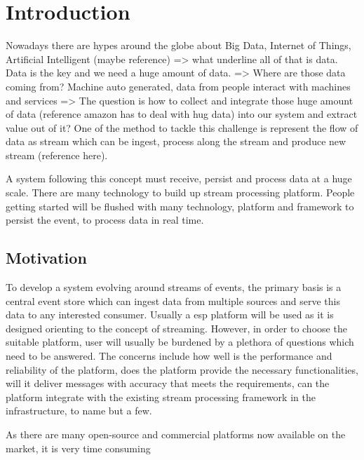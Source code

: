 \chapter{Introduction} \label{chap:intro}
Nowadays there are hypes around the globe about Big Data, Internet of Things, Artificial Intelligent (maybe reference) => what underline all of that is data. Data is the key and we need a huge amount of data. => Where are those data coming from? Machine auto generated, data from people interact with machines and services => The question is how to collect and integrate those huge amount of data (reference amazon has to deal with hug data) into our system and extract value out of it? One of the method to tackle this challenge is represent the flow of data as stream which can be ingest, process along the stream and produce new stream (reference here). 

A system following this concept must receive, persist and process data at a huge scale.  There are many technology to build up stream processing platform. People getting started will be flushed with many technology, platform and framework to persist the event, to process data in real time. 
\section{Motivation}
To develop a system evolving around streams of events, the primary basis is a central event store which can ingest data from multiple sources and serve this data to any interested consumer. Usually a \acrlong{esp} platform will be used as it is designed orienting to the concept of streaming. However, in order to choose the suitable platform, user will usually be burdened by a plethora of questions which need to be answered. The concerns include how well is the performance and reliability of the platform, does the platform provide the necessary functionalities, will it deliver messages with accuracy that meets the requirements, can the platform integrate with the existing stream processing framework in the infrastructure, to name but a few.

As there are many open-source and commercial platforms now available on the market, it is very time consuming 

